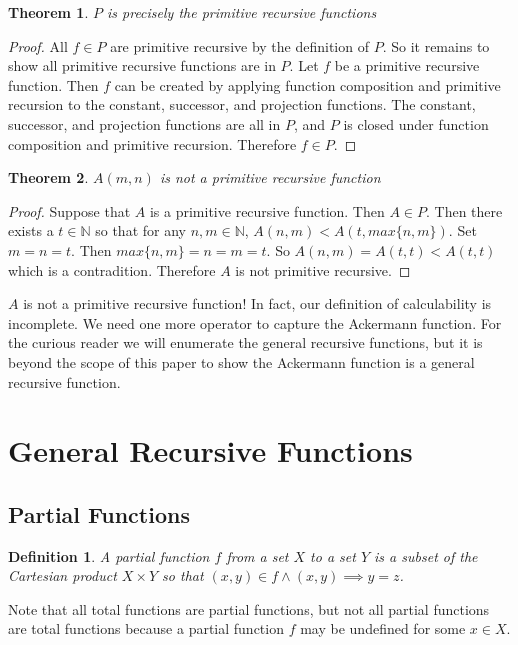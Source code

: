 \documentclass[12pt, letterpaper]{article}
\newtheorem{theorem}{Theorem}
\newtheorem*{definition}{Definition}
\theoremstyle{case}
\begin{document}
    \begin{theorem}
      $P$ is precisely the primitive recursive functions
    \end{theorem}
    \begin{proof}
      All $f \in P$ are primitive recursive by the definition of $P$.
      So it remains to show all primitive recursive functions are in $P$.
      Let $f$ be a primitive recursive function.
      Then $f$ can be created by applying function composition and primitive recursion to the constant, successor, and
      projection functions. The constant, successor, and projection functions are all in $P$, and $P$ is closed under
      function composition and primitive recursion. Therefore $f \in P$.
    \end{proof}

    \begin{theorem}
      $A(m, n)$ is not a primitive recursive function
    \end{theorem}
    \begin{proof}
      Suppose that $A$ is a primitive recursive function. Then $A \in P$. Then there exists a $t \in \mathbb{N}$
      so that for any $n, m \in \mathbb{N}$, $A(n, m) < A(t, max\{n, m\})$.
      Set $m = n = t$. Then $max\{n, m\} = n = m = t$. So $A(n, m) = A(t, t) < A(t, t)$ which is a contradition.
      Therefore $A$ is not primitive recursive.
    \end{proof}

    $A$ is not a primitive recursive function! In fact, our definition of calculability is incomplete. We need one
    more operator to capture the Ackermann function. For the curious reader we will enumerate the general recursive functions,
    but it is beyond the scope of this paper to show the Ackermann function is a general recursive function.

  \section{General Recursive Functions}
    \subsection{Partial Functions}
      \begin{definition}
        A partial function $f$ from a set $X$ to a set $Y$ is a subset of the Cartesian product $X \times Y$ so that
        $(x, y) \in f \wedge (x, y) \implies y = z$.
      \end{definition}
      Note that all total functions are partial functions, but not all partial functions are total functions because
      a partial function $f$ may be undefined for some $x \in X$.
\end{document}
